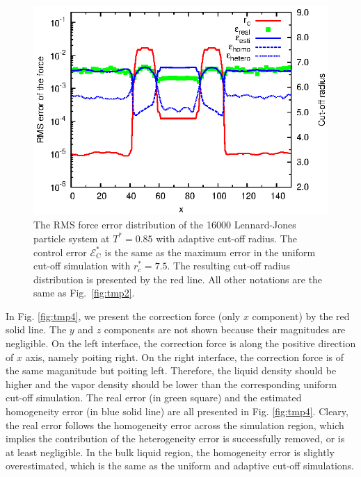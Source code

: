 \documentclass[aps,pre,preprint]{revtex4}
\begin{document}
\begin{figure}
  \centering
  \includegraphics[]{fig/t0.85-n16000-adapt-e0.0045-extend/rcut.and.error.eps}
  \caption{ The RMS force error distribution of the 16000
    Lennard-Jones particle system at $T^\ast=0.85$ with adaptive
    cut-off radius. The control error $\mathcal E^\ast_{\textrm{C}}$
    is the same as the maximum error in the uniform cut-off simulation
    with $r_c^\ast=7.5$.  The resulting cut-off radius distribution is
    presented by the red line. All other notations are the same as
    Fig.~\ref{fig:tmp2}.}
  \label{fig:tmp3}
\end{figure}


In Fig. \ref{fig:tmp4}, we present the correction force (only $x$
component) by the red solid line. The $y$ and $z$ components are not
shown because their magnitudes are negligible.  On the left interface,
the correction force is along the positive direction of $x$ axis,
namely poiting right.  On the right interface, the correction force is
of the same maganitude but poiting left. Therefore, the liquid density
should be higher and the vapor density should be lower than the
corresponding uniform cut-off simulation.  The real error (in green
square) and the estimated homogeneity error (in blue solid line) are
all presented in Fig. \ref{fig:tmp4}.  Cleary, the real error follows
the homogeneity error across the simulation region, which implies the
contribution of the heterogeneity error is successfully removed, or is
at least negligible. In the bulk liquid region, the homogeneity error
is slightly overestimated, which is the same as the uniform and
adaptive cut-off simulations.
\end{document}
